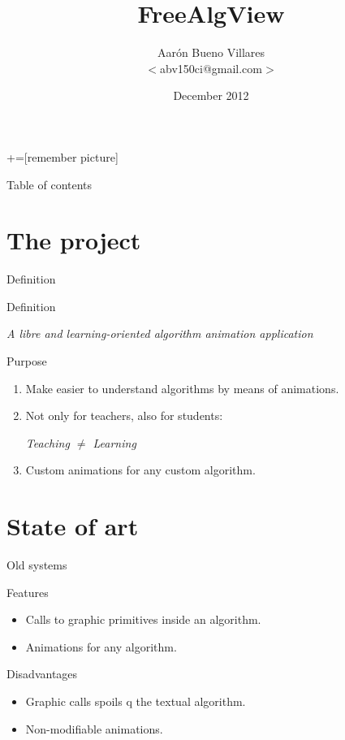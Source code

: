 \documentclass[12pt,xcolor=svgnames]{beamer}
\title[FreeAlgView]{FreeAlgView}
\author[Aarón Bueno]{Aarón Bueno Villares\\$<$abv150ci@gmail.com$>$}
\institute[UCA \& FHWS]{\textit{Universidad de Cádiz} \\ \textit{Hochschule für
    angewandte Wissenchaften Würzburg-Scheweinfurt}}
\date{December 2012}
\begin{document}
+=[remember picture]
\everymath{\displaystyle}

\begin{frame}
  \titlepage
\end{frame}

\begin{frame}{Table of contents}
  \transdissolve
  \tableofcontents
\end{frame}

\section{The project}

\begin{frame}{Definition}
  \begin{block}{Definition}
    \begin{center}
      \textit{A libre and learning-oriented algorithm animation application}
    \end{center}
  \end{block}

  \pause

  \begin{block}{Purpose}
    \begin{enumerate}
    \item Make easier to understand algorithms by means of animations.
    \item Not only for teachers, also for students:
      \begin{center}
        \textit{Teaching $\neq$ Learning}
      \end{center}
    \item Custom animations for any custom algorithm.
    \end{enumerate}
  \end{block}
\end{frame}

\section{State of art}

\begin{frame}{Old systems}
  \begin{block}{Features}
    \begin{itemize}
    \item Calls to graphic primitives inside an algorithm.
    \item Animations for any algorithm.
    \end{itemize}
  \end{block}

  \begin{block}{Disadvantages}
    \begin{itemize}
    \item Graphic calls spoils
q the textual algorithm.
    \item Non-modifiable animations.
    \end{itemize}
  \end{block}
\end{frame}
\end{document}
